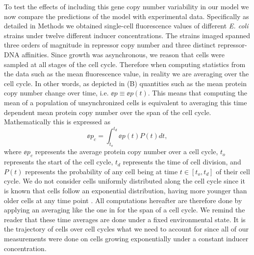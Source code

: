 To test the effects of including this gene copy number variability in our model
we now compare the predictions of the model with experimental data. Specifically
as detailed in Methods we obtained single-cell fluorescence values of
different {\it E. coli} strains under twelve different inducer concentrations.
The strains imaged spanned three orders of magnitude in repressor copy number
and three distinct repressor-DNA affinities. Since growth was asynchronous, we
reason that cells were sampled at all stages of the cell cycle. Therefore when
computing statistics from the data such as the mean fluorescence value, in
reality we are averaging over the cell cycle. In other words, as depicted in
(B) quantities such as the mean protein copy number change
over time, i.e. $\ee{p} \equiv \ee{p(t)}$. This means that computing the mean of
a population of unsynchronized cells is equivalent to averaging this time
dependent mean protein copy number over the span of the cell cycle.
Mathematically this is expressed as
\begin{equation}
	\ee{p}_c = \int_{t_o}^{t_d} \ee{p(t)} P(t) dt,
	\label{eq_time_avg}
\end{equation}
where $\ee{p}_c$ represents the average protein copy number over a cell cycle,
$t_o$ represents the start of the cell cycle, $t_d$ represents the time of cell
division, and $P(t)$ represents the probability of any cell being at time $t \in
[t_o, t_d]$ of their cell cycle. We do not consider cells uniformly distributed
along the cell cycle since it is known that cells follow an exponential
distribution, having more younger than older cells at any time point
\cite{Powell1956}. All computations hereafter are therefore done by applying an
averaging like the one in  for the span of a cell cycle.
We remind the reader that these time averages are done under a fixed
environmental state. It is the trajectory of cells over cell cycles what we need
to account for since all of our measurements were done on cells growing
exponentially under a constant inducer concentration.


